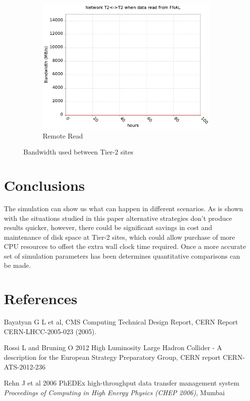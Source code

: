\documentclass[a4paper]{jpconf}
\begin{document}
\begin{figure}
\begin{subfigure}{0.3\textwidth}
    \includegraphics[width=\textwidth]{figures/F_FP0_RP0DataT2.png}
    \caption{Remote Read\label{fig:tier2Remote}}
  \end{subfigure}
  \caption{Bandwidth used between Tier-2 sites\label{fig:tier2}}
\end{figure}

\section{Conclusions}

The simulation can show us what can happen in different scenarios. As
is shown with the situations studied in this paper alternative
strategies don't produce results quicker, however, there could be
significant savings in cost and maintenance of disk space at Tier-2
sites, which could allow purchase of more CPU resources to offset the
extra wall clock time required. Once a more accurate set of simulation
parameters has been determines quantitative comparisons can be made.

\section*{References}
\begin{thebibliography}{9}
 Bayatyan G L et al,  CMS Computing Technical Design
  Report, CERN Report CERN-LHCC-2005-023 (2005).

 Rossi L and Bruning O 2012 High Luminosity Large Hadron
  Collider - A description for the European Strategy Preparatory
  Group, CERN report CERN-ATS-2012-236

 Rehn J et al 2006 PhEDEx high-throughput data
  transfer management system {\it Proceedings of Computing in High
    Energy Physics (CHEP 2006)}, Mumbai

\end{thebibliography}
\end{document}
